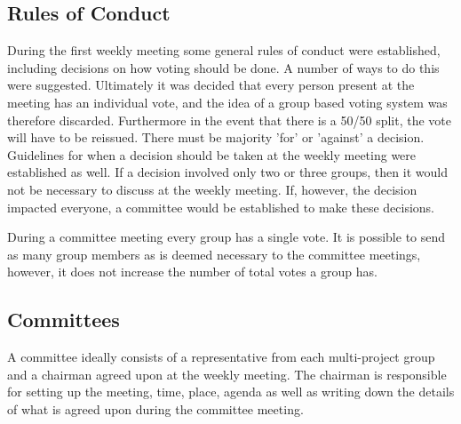 \subsection{Rules of Conduct}
\label{sub:rulesofconduct}
During the first weekly meeting some general rules of conduct were established, including decisions on how voting should be done. A number of ways to do this were suggested. Ultimately it was decided that every person present at the meeting has an individual vote, and the idea of a group based voting system was therefore discarded. Furthermore in the event that there is a 50/50 split, the vote will have to be reissued. There must be majority 'for' or 'against' a decision. Guidelines for when a decision should be taken at the weekly meeting were established as well. If a decision involved only two or three groups, then it would not be necessary to discuss at the weekly meeting. If, however, the decision impacted everyone, a committee would be established to make these decisions.


During a committee meeting every group has a single vote. It is possible to send as many group members as is deemed necessary to the committee meetings, however, it does not increase the number of total votes a group has. %

\subsection{Committees}
\label{sub:committees}
A committee ideally consists of a representative from each multi-project group and a chairman agreed upon at the weekly meeting. The chairman is responsible for setting up the meeting, time, place, agenda as well as writing down the details of what is agreed upon during the committee meeting. %

